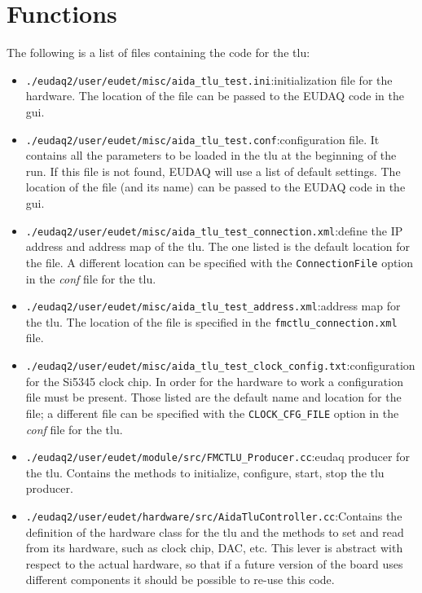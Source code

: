 \chapter{Functions}\label{ch:functions}
The following is a list of files containing the code for the \gls{tlu}:
\begin{itemize}
  \item \verb|./eudaq2/user/eudet/misc/aida_tlu_test.ini|:\newline initialization file for the hardware. The location of the file can be passed to the EUDAQ code in the \gls{gui}.
  \item \verb|./eudaq2/user/eudet/misc/aida_tlu_test.conf|:\newline configuration file. It contains all the parameters to be loaded in the \gls{tlu} at the beginning of the run. If this file is not found, EUDAQ will use a list of default settings. The location of the file (and its name) can be passed to the EUDAQ code in the \gls{gui}.
  \item \verb|./eudaq2/user/eudet/misc/aida_tlu_test_connection.xml|:\newline define the IP address and address map of the \gls{tlu}. The one listed is the default location for the file. A different location can be specified with the \verb|ConnectionFile| option in the \emph{conf} file for the \gls{tlu}.
  \item \verb|./eudaq2/user/eudet/misc/aida_tlu_test_address.xml|:\newline address map for the \gls{tlu}. The location of the file is specified in the \verb|fmctlu_connection.xml| file.
  \item \verb|./eudaq2/user/eudet/misc/aida_tlu_test_clock_config.txt|:\newline configuration for the Si5345 clock chip. In order for the hardware to work a configuration file must be present. Those listed are the default name and location for the file; a different file can be specified with the \verb|CLOCK_CFG_FILE| option in the \emph{conf} file for the \gls{tlu}.
  \item \verb|./eudaq2/user/eudet/module/src/FMCTLU_Producer.cc|:\newline eudaq producer for the \gls{tlu}. Contains the methods to initialize, configure, start, stop the \gls{tlu} producer.
  \item \verb|./eudaq2/user/eudet/hardware/src/AidaTluController.cc|:\newline Contains the definition of the hardware class for the \gls{tlu} and the methods to set and read from its hardware, such as clock chip, DAC, etc. This lever is abstract with respect to the actual hardware, so that if a future version of the board uses different components it should be possible to re-use this code.

\end{itemize}
